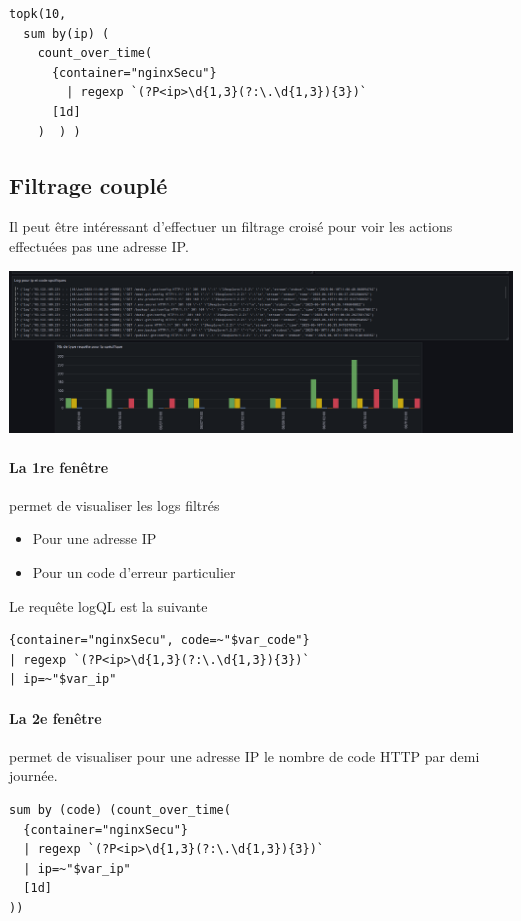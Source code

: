 \documentclass[french, 12pt]{article}%
\newcommand{\itemE}{\item[$\bullet$]}
\begin{document}
\begin{lstlisting}[style=commande]
topk(10,
  sum by(ip) (
    count_over_time(
      {container="nginxSecu"} 
        | regexp `(?P<ip>\d{1,3}(?:\.\d{1,3}){3})`
      [1d]
    )  ) )
\end{lstlisting}
\subsection{Filtrage couplé}

Il peut être intéressant d'effectuer un filtrage croisé pour voir les actions effectuées pas une adresse IP. 


\begin{center}
\includegraphics[scale=0.3]{./ressource/filtrageCroise}
\end{center}

\paragraph{La 1re fenêtre} permet de visualiser les logs filtrés
\begin{itemize}
\itemE Pour une adresse IP
\itemE Pour un code d'erreur particulier
\end{itemize}

Le requête logQL est la suivante 
\begin{lstlisting}[style=commande]
{container="nginxSecu", code=~"$var_code"}
| regexp `(?P<ip>\d{1,3}(?:\.\d{1,3}){3})`
| ip=~"$var_ip"
\end{lstlisting}


\paragraph{La 2e fenêtre} permet de visualiser pour une adresse IP le nombre de code HTTP par demi journée.

\begin{lstlisting}[style=commande]
sum by (code) (count_over_time(
  {container="nginxSecu"}
  | regexp `(?P<ip>\d{1,3}(?:\.\d{1,3}){3})`
  | ip=~"$var_ip"
  [1d]
))
\end{lstlisting}
\end{document}

